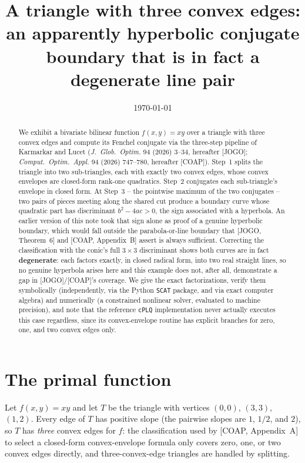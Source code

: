 \documentclass[11pt]{article}
\title{A triangle with three convex edges: an apparently hyperbolic conjugate\\ boundary that is in fact a degenerate line pair}
\author{}
\date{\today}
\begin{document}
\maketitle

\begin{abstract}
We exhibit a bivariate bilinear function $f(x,y)=xy$ over a triangle with three
convex edges and compute its Fenchel conjugate via the three-step pipeline of
Karmarkar and Lucet (\emph{J.\ Glob.\ Optim.} 94 (2026) 3--34, hereafter [JOGO];
\emph{Comput.\ Optim.\ Appl.} 94 (2026) 747--780, hereafter [COAP]). Step~1
splits the triangle into two sub-triangles, each with exactly two convex edges,
whose convex envelopes are closed-form rank-one quadratics. Step~2 conjugates
each sub-triangle's envelope in closed form. At Step~3 -- the pointwise
maximum of the two conjugates -- two pairs of pieces meeting along the shared
cut produce a boundary curve whose quadratic part has discriminant
$b^2-4ac>0$, the sign associated with a hyperbola. An earlier version of this
note took that sign alone as proof of a genuine hyperbolic boundary, which
would fall outside the parabola-or-line boundary that [JOGO, Theorem~6] and
[COAP, Appendix~B] assert is always sufficient. Correcting the classification
with the conic's full $3\times3$ discriminant shows both curves are in fact
\textbf{degenerate}: each factors exactly, in closed radical form, into two
real straight lines, so no genuine hyperbola arises here and this example
does not, after all, demonstrate a gap in [JOGO]/[COAP]'s coverage. We give
the exact factorizations, verify them symbolically (independently, via the
Python \texttt{SCAT} package, and via exact computer algebra) and numerically
(a constrained nonlinear solver, evaluated to machine precision), and note
that the reference \texttt{cPLQ} implementation never actually executes this
case regardless, since its convex-envelope routine has explicit branches for
zero, one, and two convex edges only.
\end{abstract}

\section{The primal function}

Let $f(x,y) = xy$ and let $T$ be the triangle with vertices $(0,0)$, $(3,3)$,
$(1,2)$. Every edge of $T$ has positive slope (the pairwise slopes are $1$,
$1/2$, and $2$), so $T$ has \emph{three} convex edges for $f$: the classification
used by [COAP, Appendix~A] to select a closed-form convex-envelope formula
only covers zero, one, or two convex edges directly, and three-convex-edge
triangles are handled by splitting.
\end{document}

